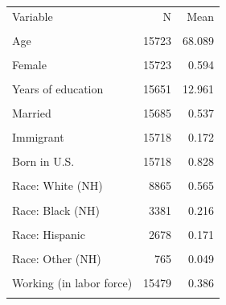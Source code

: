 \begin{tabular}{lrr}\toprule
Variable & N & Mean \\\\ \midrule
Age & 15723 & 68.089 \\\\
Female & 15723 & 0.594 \\\\
Years of education & 15651 & 12.961 \\\\
Married & 15685 & 0.537 \\\\
Immigrant & 15718 & 0.172 \\\\
Born in U.S. & 15718 & 0.828 \\\\
Race: White (NH) & 8865 & 0.565 \\\\
Race: Black (NH) & 3381 & 0.216 \\\\
Race: Hispanic & 2678 & 0.171 \\\\
Race: Other (NH) & 765 & 0.049 \\\\
Working (in labor force) & 15479 & 0.386 \\\\
\bottomrule
\end{tabular}
